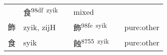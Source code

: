 \documentclass[14pt,a4paper]{scrartcl}
\begin{document}
\begin{longtable}[c]{@{}llllll@{}}
\begin{minipage}[t]{0.14\columnwidth}
\strut\end{minipage} &
\begin{minipage}[t]{0.14\columnwidth}\raggedright\strut
食\textsuperscript{98df~zyik}
\strut\end{minipage} &
\begin{minipage}[t]{0.14\columnwidth}\raggedright\strut
\strut\end{minipage} &
\begin{minipage}[t]{0.14\columnwidth}\raggedright\strut
mixed
\strut\end{minipage}\tabularnewline
\begin{minipage}[t]{0.14\columnwidth}\raggedright\strut
飾
\strut\end{minipage} &
\begin{minipage}[t]{0.14\columnwidth}\raggedright\strut
zyik, zijH
\strut\end{minipage} &
\begin{minipage}[t]{0.14\columnwidth}\raggedright\strut
\strut\end{minipage} &
\begin{minipage}[t]{0.14\columnwidth}\raggedright\strut
飾\textsuperscript{98fe~syik}
\strut\end{minipage} &
\begin{minipage}[t]{0.14\columnwidth}\raggedright\strut
\strut\end{minipage} &
\begin{minipage}[t]{0.14\columnwidth}\raggedright\strut
pure:other
\strut\end{minipage}\tabularnewline
\begin{minipage}[t]{0.14\columnwidth}\raggedright\strut
食
\strut\end{minipage} &
\begin{minipage}[t]{0.14\columnwidth}\raggedright\strut
syik
\strut\end{minipage} &
\begin{minipage}[t]{0.14\columnwidth}\raggedright\strut
\strut\end{minipage} &
\begin{minipage}[t]{0.14\columnwidth}\raggedright\strut
蝕\textsuperscript{8755~zyik}
\strut\end{minipage} &
\begin{minipage}[t]{0.14\columnwidth}\raggedright\strut
\strut\end{minipage} &
\begin{minipage}[t]{0.14\columnwidth}\raggedright\strut
pure:other
\strut\end{minipage}\tabularnewline
\bottomrule
\end{longtable}
\end{document}

